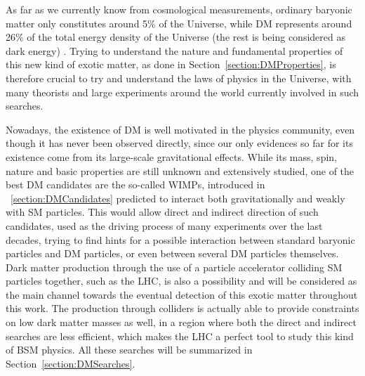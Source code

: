 \documentclass[a4paper, 10pt, openright]{report}
\begin{document}
As far as we currently know from cosmological measurements, ordinary baryonic matter only constitutes around 5\% of the Universe, while  \ac{DM} represents around 26\% of the total energy density of the Universe (the rest is being considered as dark energy) \cite{Repartition}. Trying to understand the nature and fundamental properties of this new kind of exotic matter, as done in Section~\ref{section:DMProperties}, is therefore crucial to try and understand the laws of physics in the Universe, with many theorists and large experiments around the world currently involved in such searches. 

Nowadays, the existence of \ac{DM} is well motivated in the physics community, even though it has never been observed directly, since our only evidences so far for its existence come from its large-scale gravitational effects. While its mass, spin, nature and basic properties are still unknown and extensively studied, one of the best \ac{DM} candidates are the so-called \acp{WIMP}, introduced in ~\ref{section:DMCandidates} predicted to interact both gravitationally and weakly with \ac{SM} particles. This would allow direct and indirect direction of such candidates, used as the driving process of many experiments over the last decades, trying to find hints for a possible interaction between standard baryonic particles and \ac{DM} particles, or even between several \ac{DM} particles themselves. Dark matter production through the use of a particle accelerator colliding \ac{SM} particles together, such as the \ac{LHC}, is also a possibility and will be considered as the main channel towards the eventual detection of this exotic matter throughout this work. The production through colliders is actually able to provide constraints on low dark matter masses as well, in a region where both the direct and indirect searches are less efficient, which makes the \ac{LHC} a perfect tool to study this kind of \ac{BSM} physics. All these searches will be summarized in Section~\ref{section:DMSearches}.
\end{document}
